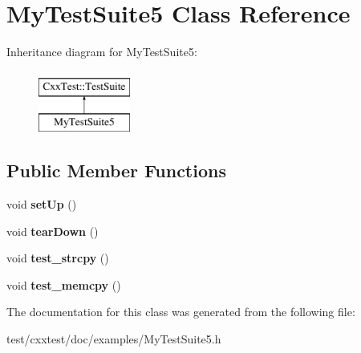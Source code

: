 \hypertarget{classMyTestSuite5}{\section{My\-Test\-Suite5 Class Reference}
\label{classMyTestSuite5}
}
Inheritance diagram for My\-Test\-Suite5\-:\begin{figure}[H]
\begin{center}
\leavevmode
\includegraphics[height=2.000000cm]{classMyTestSuite5}
\end{center}
\end{figure}
\subsection*{Public Member Functions}
\begin{DoxyCompactItemize}
\item 
\hypertarget{classMyTestSuite5_aa751d707149e3e2c7a6509d9230733f4}{void {\bfseries set\-Up} ()}\label{classMyTestSuite5_aa751d707149e3e2c7a6509d9230733f4}

\item 
\hypertarget{classMyTestSuite5_afa489832f6760432594429b2dc10f299}{void {\bfseries tear\-Down} ()}\label{classMyTestSuite5_afa489832f6760432594429b2dc10f299}

\item 
\hypertarget{classMyTestSuite5_ad0729638d0657e371a239391457e1d8b}{void {\bfseries test\-\_\-strcpy} ()}\label{classMyTestSuite5_ad0729638d0657e371a239391457e1d8b}

\item 
\hypertarget{classMyTestSuite5_a6381209992621b2930c041ebe1836643}{void {\bfseries test\-\_\-memcpy} ()}\label{classMyTestSuite5_a6381209992621b2930c041ebe1836643}

\end{DoxyCompactItemize}


The documentation for this class was generated from the following file\-:\begin{DoxyCompactItemize}
\item 
test/cxxtest/doc/examples/My\-Test\-Suite5.\-h\end{DoxyCompactItemize}
